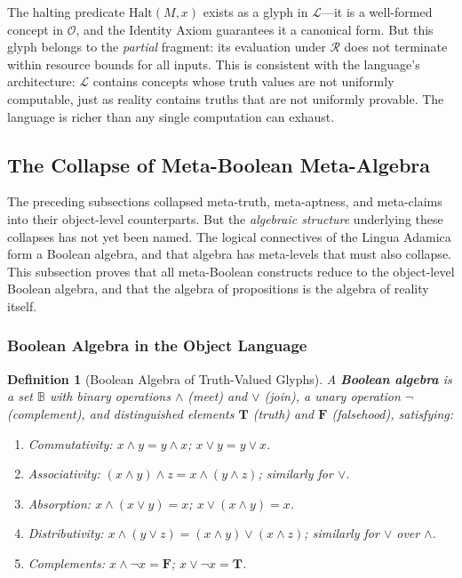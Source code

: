 \documentclass[12pt, letterpaper]{book}
\newtheorem{definition}{Definition}[chapter]
\begin{document}
The halting predicate $\mathrm{Halt}(M,x)$ exists as a glyph in $\mathcal{L}$---it is a well-formed concept in $\mathcal{O}$, and the Identity Axiom guarantees it a canonical form. But this glyph belongs to the \textit{partial} fragment: its evaluation under $\mathcal{R}$ does not terminate within resource bounds for all inputs. This is consistent with the language's architecture: $\mathcal{L}$ contains concepts whose truth values are not uniformly computable, just as reality contains truths that are not uniformly provable. The language is richer than any single computation can exhaust.


\subsection{The Collapse of Meta-Boolean Meta-Algebra}

The preceding subsections collapsed meta-truth, meta-aptness, and meta-claims into their object-level counterparts. But the \textit{algebraic structure} underlying these collapses has not yet been named. The logical connectives of the Lingua Adamica form a Boolean algebra, and that algebra has meta-levels that must also collapse. This subsection proves that all meta-Boolean constructs reduce to the object-level Boolean algebra, and that the algebra of propositions is the algebra of reality itself.

\subsubsection{Boolean Algebra in the Object Language}

\begin{definition}[Boolean Algebra of Truth-Valued Glyphs]\label{def:boolean-algebra}
A \textbf{Boolean algebra} is a set $\mathbb{B}$ with binary operations $\land$ (meet) and $\lor$ (join), a unary operation $\neg$ (complement), and distinguished elements $\mathbf{T}$ (truth) and $\mathbf{F}$ (falsehood), satisfying:
\begin{enumerate}[label=(\roman*)]
    \item \textit{Commutativity}: $x \land y = y \land x$; \; $x \lor y = y \lor x$.
    \item \textit{Associativity}: $(x \land y) \land z = x \land (y \land z)$; \; similarly for $\lor$.
    \item \textit{Absorption}: $x \land (x \lor y) = x$; \; $x \lor (x \land y) = x$.
    \item \textit{Distributivity}: $x \land (y \lor z) = (x \land y) \lor (x \land z)$; \; similarly for $\lor$ over $\land$.
    \item \textit{Complements}: $x \land \neg x = \mathbf{F}$; \; $x \lor \neg x = \mathbf{T}$.
\end{enumerate}
\end{definition}
\end{document}
